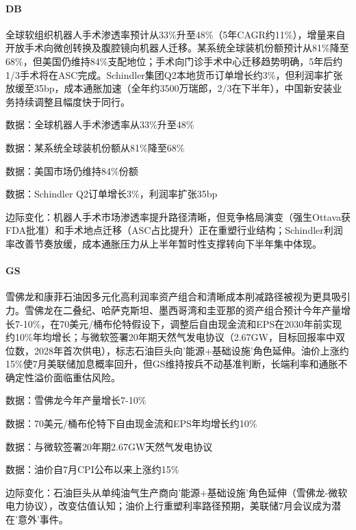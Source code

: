 \documentclass[11pt]{ctexart}
\begin{document}
\paragraph{DB} 全球软组织机器人手术渗透率预计从33\%升至48\%（5年CAGR约11\%），增量来自开放手术向微创转换及腹腔镜向机器人迁移。某系统全球装机份额预计从81\%降至68\%，但美国仍维持84\%支配地位；手术向门诊手术中心迁移趋势明确，5年后约1/3手术将在ASC完成。Schindler集团Q2本地货币订单增长约3\%，但利润率扩张放缓至35bp，成本通胀加速（全年约3500万瑞郎，2/3在下半年），中国新安装业务持续调整且幅度快于同行。
{\small\color{refgray}数据：全球机器人手术渗透率从33\%升至48\%\par}
{\small\color{refgray}数据：某系统全球装机份额从81\%降至68\%\par}
{\small\color{refgray}数据：美国市场仍维持84\%份额\par}
{\small\color{refgray}数据：Schindler Q2订单增长3\%，利润率扩张35bp\par}
{\small\color{refgray}边际变化：机器人手术市场渗透率提升路径清晰，但竞争格局演变（强生Ottava获FDA批准）和手术地点迁移（ASC占比提升）正在重塑行业结构；Schindler利润率改善节奏放缓，成本通胀压力从上半年暂时性支撑转向下半年集中体现。\par}
\paragraph{GS} 雪佛龙和康菲石油因多元化高利润率资产组合和清晰成本削减路径被视为更具吸引力。雪佛龙在二叠纪、哈萨克斯坦、墨西哥湾和圭亚那的资产组合预计今年产量增长7-10\%，在70美元/桶布伦特假设下，调整后自由现金流和EPS在2030年前实现约10\%年均增长；与微软签署20年期天然气发电协议（2.67GW，目标回报率中双位数，2028年首次供电），标志石油巨头向'能源+基础设施'角色延伸。油价上涨约15\%使7月美联储加息概率回升，但GS维持按兵不动基准判断，长端利率和通胀不确定性溢价面临重估风险。
{\small\color{refgray}数据：雪佛龙今年产量增长7-10\%\par}
{\small\color{refgray}数据：70美元/桶布伦特下自由现金流和EPS年均增长约10\%\par}
{\small\color{refgray}数据：与微软签署20年期2.67GW天然气发电协议\par}
{\small\color{refgray}数据：油价自7月CPI公布以来上涨约15\%\par}
{\small\color{refgray}边际变化：石油巨头从单纯油气生产商向'能源+基础设施'角色延伸（雪佛龙-微软电力协议），改变估值认知；油价上行重塑利率路径预期，美联储7月会议成为潜在'意外'事件。\par}
\end{document}
